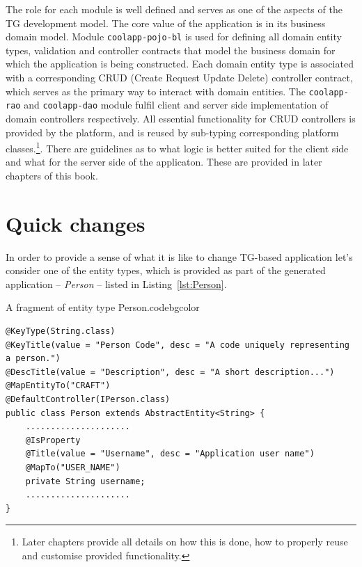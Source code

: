  The role for each module is well defined and serves as one of the aspects of the TG development model.
  The core value of the application is in its business domain model.
  Module \texttt{coolapp-pojo-bl} is used for defining all domain entity types, validation and controller contracts that model the business domain for which the application is being constructed.
  Each domain entity type is associated with a corresponding CRUD (Create Request Update Delete) controller contract, which serves as the primary way to interact with domain entities.
  The \texttt{coolapp-rao} and \texttt{coolapp-dao} module fulfil client and server side implementation of domain controllers respectively.
  All essential functionality for CRUD controllers is provided by the platform, and is reused by sub-typing corresponding platform classes.\footnote{Later chapters provide all details on how this is done, how to properly reuse and customise provided functionality.}.
  There are guidelines as to what logic is better suited for the client side and what for the server side of the applicaton.
  These are provided in later chapters of this book.  

\section{Quick changes}

  In order to provide a sense of what it is like to change TG-based application let's consider one of the entity types, which is provided as part of the generated application -- \emph{Person} -- listed in Listing~\ref{lst:Person}.

  \begin{code}{A fragment of entity type Person.}{\label{lst:Person}}{codebgcolor}
    \begin{lstlisting}
@KeyType(String.class)
@KeyTitle(value = "Person Code", desc = "A code uniquely representing a person.")
@DescTitle(value = "Description", desc = "A short description...")
@MapEntityTo("CRAFT")
@DefaultController(IPerson.class)
public class Person extends AbstractEntity<String> {
    .....................
    @IsProperty
    @Title(value = "Username", desc = "Application user name")
    @MapTo("USER_NAME")
    private String username;
    .....................
}
    \end{lstlisting}
  \end{code}
  
